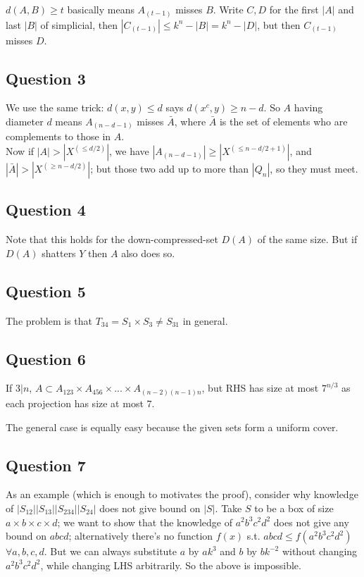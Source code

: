 \documentclass[a4paper]{article}
\begin{document}
$d(A,B) \geq t$ basically means $A_{(t-1)}$ misses $B$. Write $C,D$ for the first $|A|$ and last $|B|$ of simplicial, then $|C_{(t-1)}| \leq k^n - |B| = k^n-|D|$, but then $C_{(t-1)}$ misses $D$.

\subsection{Question 3}

We use the same trick: $d(x,y) \leq d$ says $d(x^c,y) \geq n-d$. So $A$ having diameter $d$ means $A_{(n-d-1)}$ misses $\bar{A}$, where $\bar{A}$ is the set of elements who are complements to those in $A$.\\
Now if $|A| > |X^{(\leq d/2)}|$, we have $|A_{(n-d-1)}| \geq |X^{(\leq n-d/2+1)}|$, and $|\bar{A}| > |X^{(\geq n-d/2)}|$; but those two add up to more than $|Q_n|$, so they must meet.

\subsection{Question 4}

Note that this holds for the down-compressed-set $D(A)$ of the same size. But if $D(A)$ shatters $Y$ then $A$ also does so.


\subsection{Question 5}

The problem is that $T_{34} = S_1 \times S_3 \neq S_{31}$ in general.

\subsection{Question 6}

If $3|n$, $A \subset A_{123} \times A_{456} \times ... \times A_{(n-2)(n-1)n}$, but RHS has size at most $7^{n/3}$ as each projection has size at most $7$.

The general case is equally easy because the given sets form a uniform cover.

\subsection{Question 7}

As an example (which is enough to motivates the proof), consider why knowledge of $|S_{12}||S_{13}||S_{234}||S_{24}|$ does not give bound on $|S|$. Take $S$ to be a box of size $a \times b \times c \times d$; we want to show that the knowledge of $a^2b^3c^2d^2$ does not give any bound on $abcd$; alternatively there's no function $f(x)$ s.t. $abcd \leq f(a^2b^3c^2d^2)$ $\forall a,b,c,d$. But we can always substitute $a$ by $ak^3$ and $b$ by $bk^{-2}$ without changing $a^2b^3c^2d^2$, while changing LHS arbitrarily. So the above is impossible.
\end{document}
